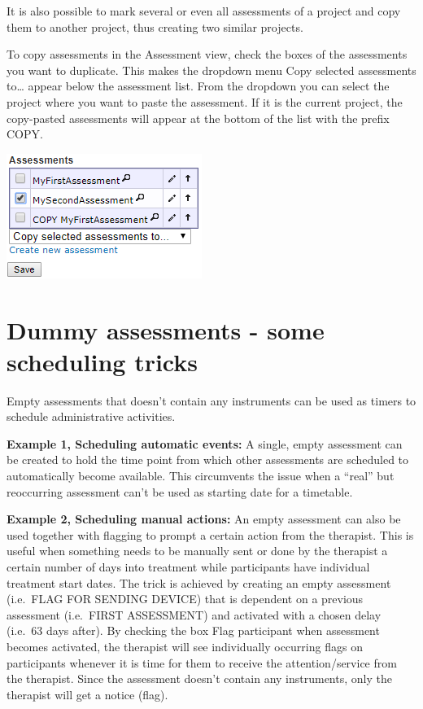 \documentclass[]{book}
\begin{document}
It is also possible to mark several or even all assessments of a project and copy them to another project, thus creating two similar projects.

To copy assessments in the Assessment view, check the boxes of the assessments you want to duplicate. This makes the dropdown menu Copy selected assessments to\ldots{} appear below the assessment list. From the dropdown you can select the project where you want to paste the assessment. If it is the current project, the copy-pasted assessments will appear at the bottom of the list with the prefix COPY.

\includegraphics{images/copy-assessment.png}

\hypertarget{dummy-assessments---some-scheduling-tricks}{%
\section{Dummy assessments - some scheduling tricks}\label{dummy-assessments---some-scheduling-tricks}}

Empty assessments that doesn't contain any instruments can be used as timers to schedule administrative activities.

\textbf{Example 1, Scheduling automatic events:} A single, empty assessment can be created to hold the time point from which other assessments are scheduled to automatically become available. This circumvents the issue when a ``real'' but reoccurring assessment can't be used as starting date for a timetable.

\textbf{Example 2, Scheduling manual actions:} An empty assessment can also be used together with flagging to prompt a certain action from the therapist. This is useful when something needs to be manually sent or done by the therapist a certain number of days into treatment while participants have individual treatment start dates. The trick is achieved by creating an empty assessment (i.e.~FLAG FOR SENDING DEVICE) that is dependent on a previous assessment (i.e.~FIRST ASSESSMENT) and activated with a chosen delay (i.e.~63 days after). By checking the box Flag participant when assessment becomes activated, the therapist will see individually occurring flags on participants whenever it is time for them to receive the attention/service from the therapist. Since the assessment doesn't contain any instruments, only the therapist will get a notice (flag).
\end{document}
